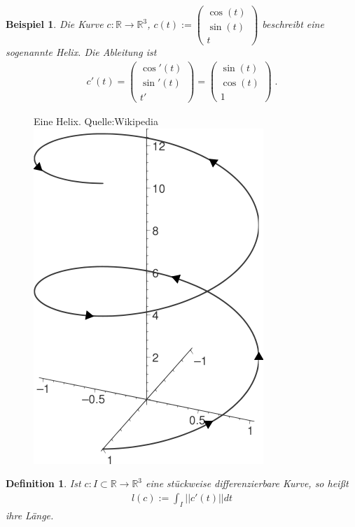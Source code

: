 \documentclass[]{article}
\newtheorem{Definition}{Definition}
\newtheorem{Beispiel}{Beispiel}
\begin{document}
\begin{Beispiel}
Die Kurve 
$c :  \mathbb{R}   \to  \mathbb{R}^3$, $c(t) :=  \begin{pmatrix} \cos(t) \\  \sin(t) \\  t \end{pmatrix}$
beschreibt eine sogenannte Helix. Die Ableitung ist
\begin{align*}
c'(t) =  \begin{pmatrix} \cos'(t) \\  \sin'(t) \\  t'  \end{pmatrix} = \begin{pmatrix} \sin(t) \\  \cos(t) \\  1 \end{pmatrix} \;.
\end{align*} 
\end{Beispiel}
\begin{figure}[H]
\centering
Eine Helix. Quelle:Wikipedia \\
\includegraphics[scale=0.5]{Helix.png}
\end{figure}

\begin{Definition}
Ist $c: I \subset \mathbb{R} \to \mathbb{R}^3$ eine stückweise differenzierbare Kurve, so heißt
\begin{align*}
l(c) := \int_{I} ||c'(t)|| dt
\end{align*}
ihre Länge.
\end{Definition}
\end{document}

